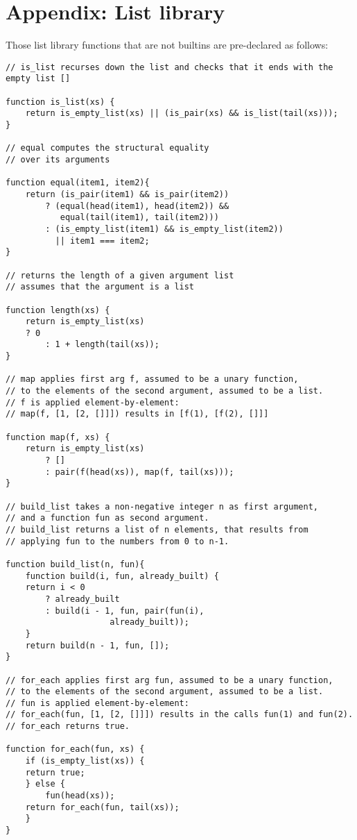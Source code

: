 \section*{Appendix: List library}

Those list library functions that are not builtins are pre-declared as follows:

\begin{lstlisting}
// is_list recurses down the list and checks that it ends with the empty list []

function is_list(xs) {
    return is_empty_list(xs) || (is_pair(xs) && is_list(tail(xs)));
}

// equal computes the structural equality 
// over its arguments

function equal(item1, item2){
    return (is_pair(item1) && is_pair(item2)) 
        ? (equal(head(item1), head(item2)) &&
           equal(tail(item1), tail(item2)))
        : (is_empty_list(item1) && is_empty_list(item2))
          || item1 === item2;
}

// returns the length of a given argument list
// assumes that the argument is a list

function length(xs) {
    return is_empty_list(xs) 
	? 0
        : 1 + length(tail(xs));
}

// map applies first arg f, assumed to be a unary function,
// to the elements of the second argument, assumed to be a list.
// f is applied element-by-element: 
// map(f, [1, [2, []]]) results in [f(1), [f(2), []]]

function map(f, xs) {
    return is_empty_list(xs)
        ? []
        : pair(f(head(xs)), map(f, tail(xs)));
}

// build_list takes a non-negative integer n as first argument,
// and a function fun as second argument.
// build_list returns a list of n elements, that results from 
// applying fun to the numbers from 0 to n-1.

function build_list(n, fun){
    function build(i, fun, already_built) {
	return i < 0
	    ? already_built
	    : build(i - 1, fun, pair(fun(i),
		  		     already_built));
    }
    return build(n - 1, fun, []);
}

// for_each applies first arg fun, assumed to be a unary function,
// to the elements of the second argument, assumed to be a list.
// fun is applied element-by-element:
// for_each(fun, [1, [2, []]]) results in the calls fun(1) and fun(2).
// for_each returns true.

function for_each(fun, xs) {
    if (is_empty_list(xs)) {
	return true;
    } else {
        fun(head(xs));
	return for_each(fun, tail(xs));
    }
}


\end{lstlisting}
